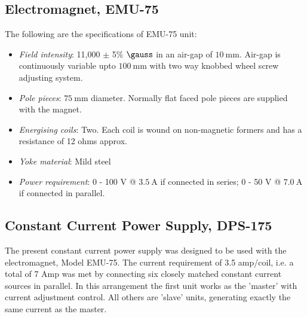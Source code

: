 \documentclass[%
 aip,
 amsmath,amssymb,
 reprint,%
]{revtex4-1}
\begin{document}
    \subsection{Electromagnet, EMU-75}
    The following are the specifications of EMU-75 unit:
    \begin{itemize}
        \item \textit{Field intensity}: 11,000 $\pm$ 5\% $\si{\gauss}$ in an air-gap of $\SI{10}{\milli \metre}$. Air-gap is continuously variable upto $\SI{100}{\milli \metre}$ with two way knobbed wheel screw adjusting system.
        \item \textit{Pole pieces}: $\SI{75}{\milli \metre}$ diameter. Normally flat faced pole pieces are supplied with the magnet.
        \item \textit{Energising coils}: Two. Each coil is wound on non-magnetic formers and has a resistance of 12 ohms approx.
        \item \textit{Yoke material}: Mild steel
        \item \textit{Power requirement}: 0 - 100 $\si{\volt}$ @ $\SI{3.5}{\ampere}$ if connected in series; 0 - 50 $\si{\volt}$ @ $\SI{7.0}{\ampere}$ if connected in parallel.
    \end{itemize}
    \subsection{Constant Current Power Supply, DPS-175}
    The present constant current power supply was designed to be used with the
    electromagnet, Model EMU-75. The current requirement of 3.5 amp/coil, i.e. a total of 7
    Amp was met by connecting six closely matched constant current sources in parallel. In
    this arrangement the first unit works as the 'master' with current adjustment control. All
    others are 'slave' units, generating exactly the same current as the master.
\end{document}
